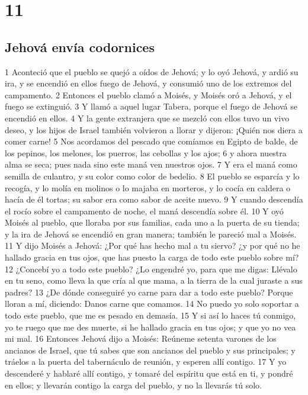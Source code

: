 \chapter{11}

\section*{Jehová envía codornices}


1 Aconteció que el pueblo se quejó a oídos de Jehová; y lo oyó Jehová, y ardió su ira, y se encendió en ellos fuego de Jehová, y consumió uno de los extremos del campamento.
2 Entonces el pueblo clamó a Moisés, y Moisés oró a Jehová, y el fuego se extinguió.
3 Y llamó a aquel lugar Tabera, porque el fuego de Jehová se encendió en ellos.
4 Y la gente extranjera que se mezcló con ellos tuvo un vivo deseo, y los hijos de Israel también volvieron a llorar y dijeron: ¡Quién nos diera a comer carne!
5 Nos acordamos del pescado que comíamos en Egipto de balde, de los pepinos, los melones, los puerros, las cebollas y los ajos;
6 y ahora nuestra alma se seca; pues nada sino este maná ven nuestros ojos.
7 Y era el maná como semilla de culantro, y su color como color de bedelio.
8 El pueblo se esparcía y lo recogía, y lo molía en molinos o lo majaba en morteros, y lo cocía en caldera o hacía de él tortas; su sabor era como sabor de aceite nuevo.
9 Y cuando descendía el rocío sobre el campamento de noche, el maná descendía sobre él.
10 Y oyó Moisés al pueblo, que lloraba por sus familias, cada uno a la puerta de su tienda; y la ira de Jehová se encendió en gran manera; también le pareció mal a Moisés.
11 Y dijo Moisés a Jehová: ¿Por qué has hecho mal a tu siervo? ¿y por qué no he hallado gracia en tus ojos, que has puesto la carga de todo este pueblo sobre mí?
12 ¿Concebí yo a todo este pueblo? ¿Lo engendré yo, para que me digas: Llévalo en tu seno, como lleva la que cría al que mama, a la tierra de la cual juraste a sus padres?
13 ¿De dónde conseguiré yo carne para dar a todo este pueblo? Porque lloran a mí, diciendo: Danos carne que comamos.
14 No puedo yo solo soportar a todo este pueblo, que me es pesado en demasía.
15 Y si así lo haces tú conmigo, yo te ruego que me des muerte, si he hallado gracia en tus ojos; y que yo no vea mi mal.
16 Entonces Jehová dijo a Moisés: Reúneme setenta varones de los ancianos de Israel, que tú sabes que son ancianos del pueblo y sus principales; y tráelos a la puerta del tabernáculo de reunión, y esperen allí contigo.
17 Y yo descenderé y hablaré allí contigo, y tomaré del espíritu que está en ti, y pondré en ellos; y llevarán contigo la carga del pueblo, y no la llevarás tú solo.
